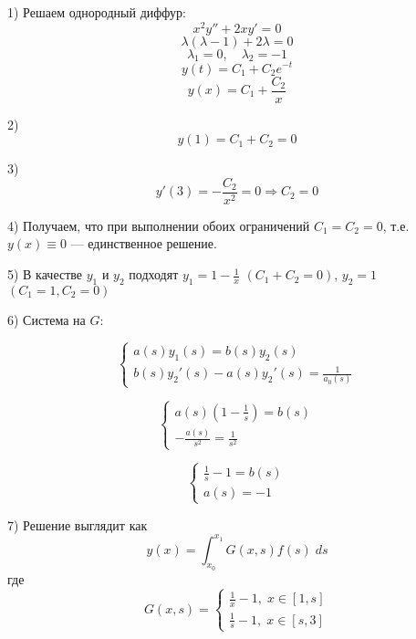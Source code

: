 \begin{solution}
  1) Решаем однородный диффур:
  $$x^2y'' + 2xy' = 0$$
  $$\lambda(\lambda - 1) + 2\lambda = 0$$
  $$\lambda_1 = 0, \quad \lambda_2 = -1$$
  $$y(t) = C_1 + C_2e^{-t}$$
  $$y(x) = C_1 + \frac{C_2}{x}$$

  2) $$y(1) = C_1 + C_2 = 0$$

  3) $$y'(3) = -\frac{C_2}{x^2} = 0 \Rightarrow C_2 = 0$$

  4) Получаем, что при выполнении обоих ограничений $C_1 = C_2 = 0$, т.е. $y(x) \equiv 0$ --- единственное решение.

  5) В качестве $y_1$ и $y_2$ подходят $y_1 = 1 - \frac{1}{x}$ $(C_1 + C_2 = 0)$, $y_2 = 1$ $(C_1 = 1, C_2 = 0)$
  
  6) Система на $G$:

  $$
  \begin{cases}
    a(s)y_1(s) = b(s)y_2(s)\\
    b(s)y_2'(s) - a(s)y_2'(s) = \frac{1}{a_0(s)}  
  \end{cases}
  $$

  $$
  \begin{cases}
    a(s)(1 - \frac{1}{s}) = b(s)\\
    - \frac{a(s)}{s^2} = \frac{1}{s^2}  
  \end{cases}
  $$

  $$
  \begin{cases}
    \frac{1}{s} - 1 = b(s)\\
    a(s) = -1
  \end{cases}
  $$

  7) Решение выглядит как 
  $$y(x) = \int_{x_0}^{x_1} G(x, s)f(s)\; ds$$
  где $$G(x, s) = \begin{cases}
    \frac{1}{x} - 1, \; x\in [1, s]\\
    \frac{1}{s} - 1, \; x\in [s, 3]
  \end{cases}$$
    
\end{solution}